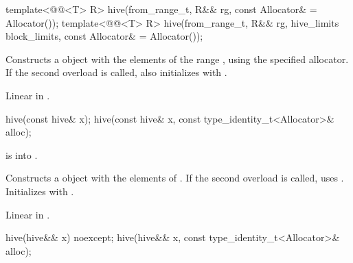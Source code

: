 %
\begin{itemdecl}
template<@@<T> R>
  hive(from_range_t, R&& rg, const Allocator& = Allocator());
template<@@<T> R>
  hive(from_range_t, R&& rg, hive_limits block_limits, const Allocator& = Allocator());
\end{itemdecl}

\begin{itemdescr}
\pnum
\effects
Constructs a  object with the elements of the range ,
using the specified allocator.
If the second overload is called,
also initializes  with .

\pnum
\complexity
Linear in .
\end{itemdescr}

%
\begin{itemdecl}
hive(const hive& x);
hive(const hive& x, const type_identity_t<Allocator>& alloc);
\end{itemdecl}

\begin{itemdescr}
\pnum
\expects
{} is  into .

\pnum
\effects
Constructs a  object with the elements of .
If the second overload is called, uses .
Initializes  with .

\pnum
\complexity
Linear in .
\end{itemdescr}

%
\begin{itemdecl}
hive(hive&& x) noexcept;
hive(hive&& x, const type_identity_t<Allocator>& alloc);
\end{itemdecl}

